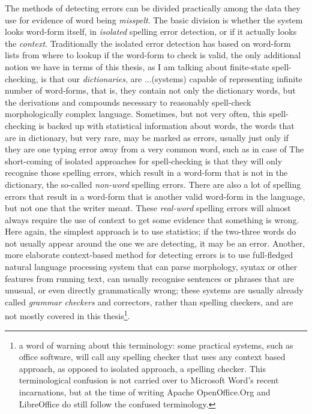 \documentclass[officiallayout]{unihelcompling}
\begin{document}
The methods of detecting errors can be divided practically among the data they
use for evidence of word being \emph{misspelt}. The basic division is whether
the system looks word-form itself, in \emph{isolated} spelling error detection,
or if it actually looks the \emph{context}. Traditionally the isolated error
detection has based on word-form lists from where to lookup if the word-form
to check is valid, the only additional notion we have in terms of this thesis,
as I am talking about finite-state spell-checking, is that our 
\emph{dictionaries}, are ...(systems) capable of representing infinite number
of word-forms, that is, they contain not only the dictionary words, but the
derivations and compounds necessary to reasonably spell-check morphologically
complex language. Sometimes, but not very often, this spell-checking is
backed up with statistical information about words, the words that are in
dictionary, but very rare, may be marked as errors, usually just only if they
are one typing error away from a very common word, such as in case of
The short-coming of isolated approaches for spell-checking
is that they will only recognise those spelling errors, which result in a
word-form that is not in the dictionary, the so-called \emph{non-word}
spelling errors. There are also a lot of spelling errors that result in a
word-form that is another valid word-form in the language, but not one that
the writer meant. These \emph{real-word} spelling errors will almost always
require the use of context to get some evidence that something is wrong. Here
again, the simplest approach is to use statistics; if the two-three words do not
usually appear around the one we are detecting, it may be an error. Another,
more elaborate context-based method for detecting errors is to use full-fledged
natural language processing system that can parse morphology, syntax or other
features from running text, can usually recognise sentences or phrases that
are unusual, or even directly grammatically wrong; these systems are usually
already called \emph{grammar checkers} and correctors, rather than spelling
checkers, and are not mostly covered in this thesis\footnote{a word of warning
    about this terminology: some practical systems, such as office software,
    will call any spelling checker that uses any context based approach,
    as opposed to isolated approach, a spelling checker. This terminological
    confusion is not carried over to Microsoft Word's recent incarnations, but
    at the time of writing Apache OpenOffice.Org and LibreOffice do still follow
the confused terminology.}.
\end{document}
